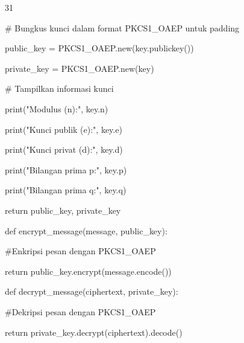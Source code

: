 \documentclass{article}
\begin{document}

31

\# Bungkus kunci dalam format PKCS1\_OAEP untuk padding

    public\_key = PKCS1\_OAEP.new(key.publickey())

    private\_key = PKCS1\_OAEP.new(key)

    \# Tampilkan informasi kunci

    print("Modulus (n):", key.n)

    print("Kunci publik (e):", key.e)

    print("Kunci privat (d):", key.d)

    print("Bilangan prima p:", key.p)

    print("Bilangan prima q:", key.q)

    return public\_key, private\_key

def encrypt\_message(message, public\_key):    

    \#Enkripsi pesan dengan PKCS1\_OAEP    

    return public\_key.encrypt(message.encode())

def decrypt\_message(ciphertext, private\_key):   

    \#Dekripsi pesan dengan PKCS1\_OAEP    

    return private\_key.decrypt(ciphertext).decode()
\end{document}
